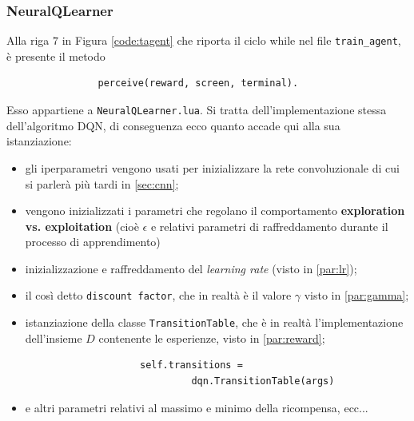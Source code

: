 \documentclass[twoside,twocolumn,10pt]{extarticle}
\theoremstyle{definition}
\begin{document}
		\subsubsection{NeuralQLearner}
			Alla riga $7$ in Figura \ref{code:tagent} che riporta il ciclo while nel file \texttt{train\_agent}, è presente il metodo
			\begin{verbatim}
				perceive(reward, screen, terminal).
			\end{verbatim}
			Esso appartiene a \texttt{NeuralQLearner.lua}. Si tratta dell'implementazione stessa dell'algoritmo DQN, di conseguenza ecco quanto accade qui alla sua istanziazione:
			\begin{itemize}
				\item gli iperparametri vengono usati per inizializzare la rete convoluzionale di cui si parlerà più tardi in \ref{sec:cnn};
				\item vengono inizializzati i parametri che regolano il comportamento \textbf{exploration vs. exploitation} (cioè $\epsilon$ e relativi parametri di raffreddamento durante il processo di apprendimento)
				\item inizializzazione e raffreddamento del \textit{learning rate} (visto in \ref{par:lr});
				\item il così detto \texttt{discount factor}, che in realtà è il valore $\gamma$ visto in \ref{par:gamma};
				\item istanziazione della classe \texttt{TransitionTable}, che è in realtà l'implementazione dell'insieme $D$ contenente le esperienze, visto in \ref{par:reward};
				\begin{verbatim}
					self.transitions = 
					         dqn.TransitionTable(args)
				\end{verbatim}
				\item e altri parametri relativi al massimo e minimo della ricompensa, ecc...
			\end{itemize}
			
\end{document}
